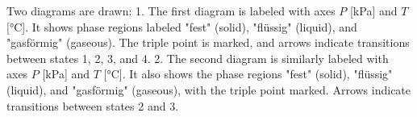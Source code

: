 Two diagrams are drawn:  
1. The first diagram is labeled with axes \( P \) [kPa] and \( T \) [°C]. It shows phase regions labeled "fest" (solid), "flüssig" (liquid), and "gasförmig" (gaseous). The triple point is marked, and arrows indicate transitions between states 1, 2, 3, and 4.  
2. The second diagram is similarly labeled with axes \( P \) [kPa] and \( T \) [°C]. It also shows the phase regions "fest" (solid), "flüssig" (liquid), and "gasförmig" (gaseous), with the triple point marked. Arrows indicate transitions between states 2 and 3.